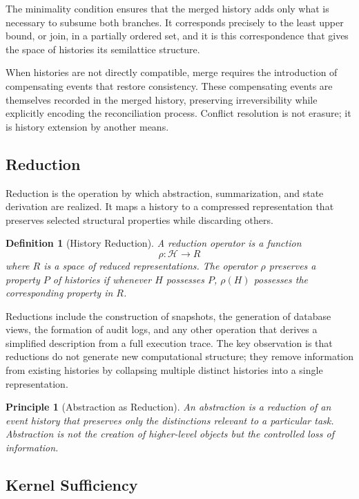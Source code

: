\documentclass[12pt]{article}
\newtheorem{definition}{Definition}
\newtheorem{principle}{Principle}
\begin{document}
The minimality condition ensures that the merged history adds only what is necessary to subsume
both branches. It corresponds precisely to the least upper bound, or join, in a partially
ordered set, and it is this correspondence that gives the space of histories its semilattice
structure.

When histories are not directly compatible, merge requires the introduction of compensating
events that restore consistency. These compensating events are themselves recorded in the merged
history, preserving irreversibility while explicitly encoding the reconciliation process.
Conflict resolution is not erasure; it is history extension by another means.

\subsection{Reduction}

Reduction is the operation by which abstraction, summarization, and state derivation are
realized. It maps a history to a compressed representation that preserves selected structural
properties while discarding others.

\begin{definition}[History Reduction]
A \emph{reduction operator} is a function
\[
\rho : \mathcal{H} \rightarrow R
\]
where $R$ is a space of reduced representations. The operator $\rho$ \emph{preserves} a
property $P$ of histories if whenever $H$ possesses $P$, $\rho(H)$ possesses the corresponding
property in $R$.
\end{definition}

Reductions include the construction of snapshots, the generation of database views, the
formation of audit logs, and any other operation that derives a simplified description from a
full execution trace. The key observation is that reductions do not generate new computational
structure; they remove information from existing histories by collapsing multiple distinct
histories into a single representation.

\begin{principle}[Abstraction as Reduction]
An abstraction is a reduction of an event history that preserves only the distinctions relevant
to a particular task. Abstraction is not the creation of higher-level objects but the controlled
loss of information.
\end{principle}

\subsection{Kernel Sufficiency}
\end{document}
